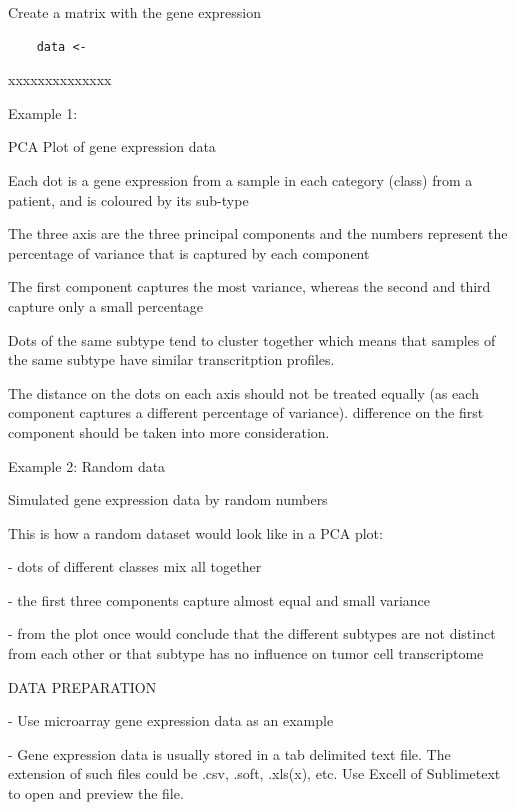 \documentclass[11pt, oneside]{article}   	%
\begin{document}
Create a matrix with the gene expression

\begin{framed}
\begin{verbatim}
	data <- 
\end{verbatim}
\end{framed}


xxxxxxxxxxxxxx




Example 1:

PCA Plot of gene expression data 

Each dot is a gene expression from a sample in each category (class) from a patient, and is coloured by its sub-type

The three axis are the three principal components 
and the numbers represent the percentage of variance that is captured by each component

The first component captures the most variance, whereas the second and third capture only a small percentage

Dots of the same subtype tend to cluster together which means that samples of the same subtype have similar transcritption profiles.


The distance on the dots on each axis should not be treated equally (as each component captures a different percentage of variance). difference on the first component should be taken into more consideration.



Example 2: Random data

Simulated gene expression data by random numbers

This is how a random dataset would look like in a PCA plot:

- dots of different classes mix all together

- the first three components capture almost equal and small variance

- from the plot once would conclude that the different subtypes are not distinct from each other or that subtype has no influence on tumor cell transcriptome



DATA PREPARATION

- Use microarray gene expression data as an example

- Gene expression data is usually stored in a tab delimited text file. The extension of such files could be .csv, .soft, .xls(x), etc. Use Excell of Sublimetext to open and preview the file.
\end{document}

